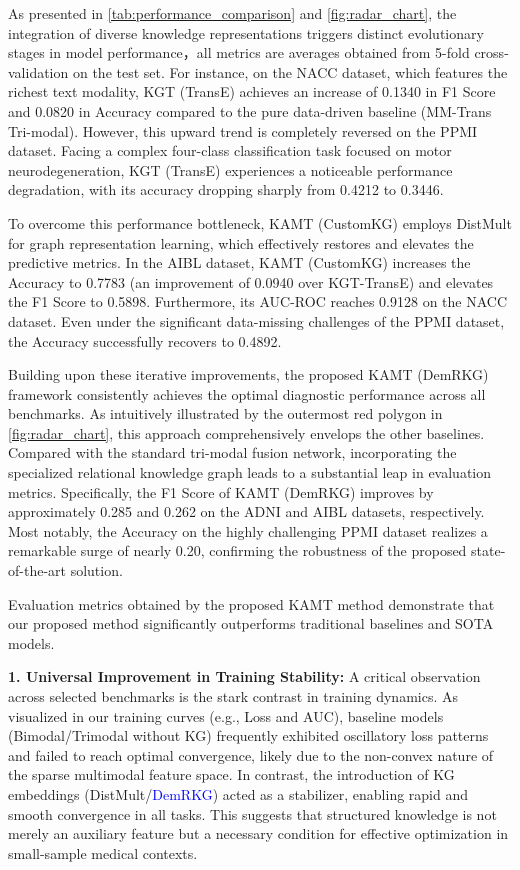 \documentclass[lettersize,journal]{IEEEtran}
\begin{document}
As presented in \cref{tab:performance_comparison} and \cref{fig:radar_chart}, the integration of diverse knowledge representations triggers distinct evolutionary stages in model performance，all metrics are averages obtained from 5-fold cross-validation on the test set. For instance, on the NACC dataset, which features the richest text modality, KGT (TransE) achieves an increase of 0.1340 in F1 Score and 0.0820 in Accuracy compared to the pure data-driven baseline (MM-Trans Tri-modal). However, this upward trend is completely reversed on the PPMI dataset. Facing a complex four-class classification task focused on motor neurodegeneration, KGT (TransE) experiences a noticeable performance degradation, with its accuracy dropping sharply from 0.4212 to 0.3446.

To overcome this performance bottleneck, KAMT (CustomKG) employs DistMult for graph representation learning, which effectively restores and elevates the predictive metrics. In the AIBL dataset, KAMT (CustomKG) increases the Accuracy to 0.7783 (an improvement of 0.0940 over KGT-TransE) and elevates the F1 Score to 0.5898. Furthermore, its AUC-ROC reaches 0.9128 on the NACC dataset. Even under the significant data-missing challenges of the PPMI dataset, the Accuracy successfully recovers to 0.4892.

Building upon these iterative improvements, the proposed KAMT (DemRKG) framework consistently achieves the optimal diagnostic performance across all benchmarks. As intuitively illustrated by the outermost red polygon in \cref{fig:radar_chart}, this approach comprehensively envelops the other baselines. Compared with the standard tri-modal fusion network, incorporating the specialized relational knowledge graph leads to a substantial leap in evaluation metrics. Specifically, the F1 Score of KAMT (DemRKG) improves by approximately 0.285 and 0.262 on the ADNI and AIBL datasets, respectively. Most notably, the Accuracy on the highly challenging PPMI dataset realizes a remarkable surge of nearly 0.20, confirming the robustness of the proposed state-of-the-art solution.
    
Evaluation metrics obtained by the proposed KAMT method demonstrate that our proposed method significantly outperforms traditional baselines and SOTA models.

\textbf{1. Universal Improvement in Training Stability:}
A critical observation across selected benchmarks is the stark contrast in training dynamics. As visualized in our training curves (e.g., Loss and AUC), baseline models (Bimodal/Trimodal without KG) frequently exhibited oscillatory loss patterns and failed to reach optimal convergence, likely due to the non-convex nature of the sparse multimodal feature space. In contrast, the introduction of KG embeddings (DistMult/\textcolor{blue}{DemRKG}) acted as a stabilizer, enabling rapid and smooth convergence in all tasks. This suggests that structured knowledge is not merely an auxiliary feature but a necessary condition for effective optimization in small-sample medical contexts.
\end{document}
